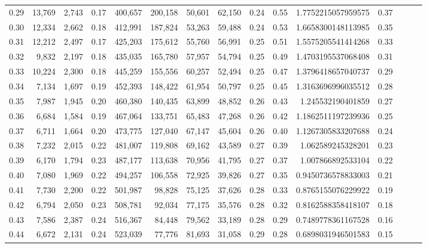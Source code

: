 \begin{tabular}{rrrrrrrrrrrrrrr}
0.29 &  13,769 &  2,743 &  0.17 &  400,657 &  200,158 &   50,601 &   62,150 &  0.24 &  0.55 &      1.7752215057959575 &      0.37 \\
0.30 &  12,334 &  2,662 &  0.18 &  412,991 &  187,824 &   53,263 &   59,488 &  0.24 &  0.53 &      1.6658300148113985 &      0.35 \\
0.31 &  12,212 &  2,497 &  0.17 &  425,203 &  175,612 &   55,760 &   56,991 &  0.25 &  0.51 &      1.5575205541414268 &      0.33 \\
0.32 &   9,832 &  2,197 &  0.18 &  435,035 &  165,780 &   57,957 &   54,794 &  0.25 &  0.49 &      1.4703195537068408 &      0.31 \\
0.33 &  10,224 &  2,300 &  0.18 &  445,259 &  155,556 &   60,257 &   52,494 &  0.25 &  0.47 &      1.3796418657040737 &      0.29 \\
0.34 &   7,134 &  1,697 &  0.19 &  452,393 &  148,422 &   61,954 &   50,797 &  0.25 &  0.45 &      1.3163696996035512 &      0.28 \\
0.35 &   7,987 &  1,945 &  0.20 &  460,380 &  140,435 &   63,899 &   48,852 &  0.26 &  0.43 &       1.245532190401859 &      0.27 \\
0.36 &   6,684 &  1,584 &  0.19 &  467,064 &  133,751 &   65,483 &   47,268 &  0.26 &  0.42 &      1.1862511197239936 &      0.25 \\
0.37 &   6,711 &  1,664 &  0.20 &  473,775 &  127,040 &   67,147 &   45,604 &  0.26 &  0.40 &      1.1267305833207688 &      0.24 \\
0.38 &   7,232 &  2,015 &  0.22 &  481,007 &  119,808 &   69,162 &   43,589 &  0.27 &  0.39 &       1.062589245328201 &      0.23 \\
0.39 &   6,170 &  1,794 &  0.23 &  487,177 &  113,638 &   70,956 &   41,795 &  0.27 &  0.37 &       1.007866892533104 &      0.22 \\
0.40 &   7,080 &  1,969 &  0.22 &  494,257 &  106,558 &   72,925 &   39,826 &  0.27 &  0.35 &      0.9450736578833003 &      0.21 \\
0.41 &   7,730 &  2,200 &  0.22 &  501,987 &   98,828 &   75,125 &   37,626 &  0.28 &  0.33 &      0.8765155076229922 &      0.19 \\
0.42 &   6,794 &  2,050 &  0.23 &  508,781 &   92,034 &   77,175 &   35,576 &  0.28 &  0.32 &      0.8162588358418107 &      0.18 \\
0.43 &   7,586 &  2,387 &  0.24 &  516,367 &   84,448 &   79,562 &   33,189 &  0.28 &  0.29 &      0.7489778361167528 &      0.16 \\
0.44 &   6,672 &  2,131 &  0.24 &  523,039 &   77,776 &   81,693 &   31,058 &  0.29 &  0.28 &      0.6898031946501583 &      0.15 \\

\end{tabular}
